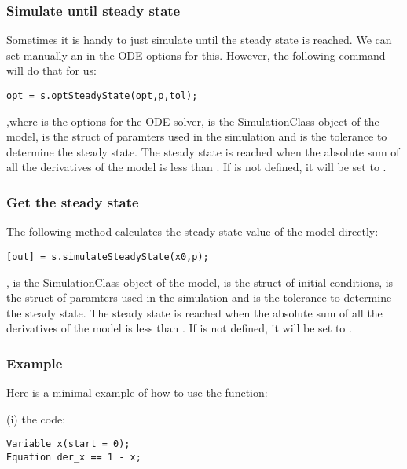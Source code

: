 \documentclass[11pt]{article}
\begin{document}
\subsubsection{Simulate until steady state}

Sometimes it is handy to just simulate until the steady state is reached. We can set manually an  in the ODE options for this. However, the following command will do that for us:

\begin{lstlisting}
opt = s.optSteadyState(opt,p,tol);
\end{lstlisting}

,where  is the options for the ODE solver,  is the SimulationClass object of the model,  is the struct of paramters used in the simulation and  is the tolerance to determine the steady state. The steady state is reached when the absolute sum of all the derivatives of the model is less than . If  is not defined, it will be set to .

\subsubsection{Get the steady state}

The following method calculates the steady state value of the model directly:

\begin{lstlisting}
[out] = s.simulateSteadyState(x0,p);
\end{lstlisting}

,  is the SimulationClass object of the model,  is the struct of initial conditions,  is the struct of paramters used in the simulation and  is the tolerance to determine the steady state. The steady state is reached when the absolute sum of all the derivatives of the model is less than . If  is not defined, it will be set to .

\subsubsection{Example}

Here is a minimal example of how to use the  function:

(i) the  code:

\begin{lstlisting}
Variable x(start = 0);  
Equation der_x == 1 - x;
\end{lstlisting}
\end{document}
